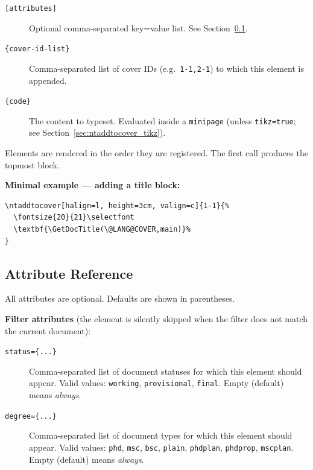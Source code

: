 \begin{description}
  \item[\texttt{[attributes]}] Optional comma-separated key=value list.
        See Section~\ref{sec:ntaddtocover_attrs}.
  \item[\texttt{\{cover-id-list\}}] Comma-separated list of cover IDs (e.g.\
        \verb!1-1,2-1!) to which this element is appended.
  \item[\texttt{\{code\}}] The content to typeset.  Evaluated inside a
        \verb!minipage! (unless \verb!tikz=true!; see
        Section~\ref{sec:ntaddtocover_tikz}).
\end{description}

Elements are rendered in the order they are registered.  The first call
produces the topmost block.

\medskip
\noindent\textbf{Minimal example — adding a title block:}
\begin{verbatim}
\ntaddtocover[halign=l, height=3cm, valign=c]{1-1}{%
  \fontsize{20}{21}\selectfont
  \textbf{\GetDocTitle(\@LANG@COVER,main)}%
}
\end{verbatim}


\subsection{Attribute Reference}
\label{sec:ntaddtocover_attrs}

All attributes are optional.  Defaults are shown in parentheses.

\medskip
\noindent\textbf{Filter attributes} (the element is silently skipped when
the filter does not match the current document):

\begin{description}
  \item[\texttt{status=\{...\}}] Comma-separated list of document statuses
        for which this element should appear.  Valid values: \texttt{working},
        \texttt{provisional}, \texttt{final}.  Empty (default) means
        \emph{always}.
  \item[\texttt{degree=\{...\}}] Comma-separated list of document types
        for which this element should appear.  Valid values: \texttt{phd},
        \texttt{msc}, \texttt{bsc}, \texttt{plain}, \texttt{phdplan},
        \texttt{phdprop}, \texttt{mscplan}.  Empty (default) means
        \emph{always}.
\end{description}

